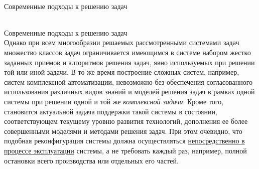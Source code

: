 \begin{frame}{\\Современные подходы к решению задач}
	\topline
	\justifying
	\vspace*{\fill}\\
	\footnotesize{
		\begin{SCn}
			\begin{scnindent}
			\end{scnindent}
		\end{SCn}
	}
	
\end{frame}

\begin{frame}{\\Современные подходы к решению задач}
	\topline
	\justifying
	\vspace*{\fill}\\
	Однако при всем многообразии решаемых рассмотренными системами задач множество классов задач ограничивается имеющимся в системе набором жестко заданных приемов и алгоритмов решения задач, явно используемых при решении той или иной задачи. В то же время построение сложных систем, например, систем комплексной автоматизации, невозможно без обеспечения согласованного использования различных видов знаний и моделей решения задач в рамках одной системы при решении одной и той же \textit{комплексной задачи}. Кроме того, становится актуальной задача поддержки такой системы в состоянии, соответствующем текущему уровню развития технологий, дополнения ее более совершенными моделями и методами решения задач. При этом очевидно, что подобная реконфигурация системы должна осуществляться \underline{непосредственно в процессе эксплуатации} системы, а не требовать каждый раз, например, полной остановки всего производства или отдельных его частей.
\end{frame}

